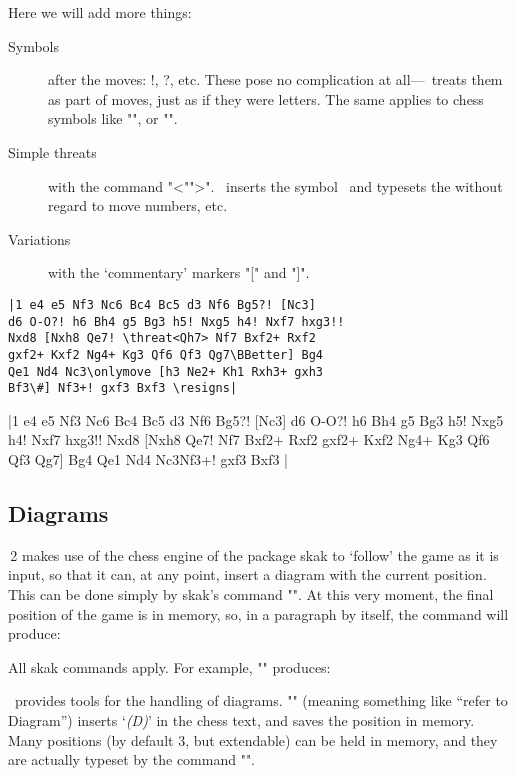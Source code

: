 \documentclass[12pt]{ltxdoc}
\begin{document}
Here we will add  more things:

\begin{description}
\item[Symbols] after the moves: !, ?, etc. These pose no complication at all---\TeXmate\ treats them as part of moves, just as if they were letters. The same applies to chess symbols like "\betteris", or "\onlymove".
\item[Simple threats] with the command \DescribeMacro{\threat}"\threat<"">". \TeXmate\ inserts the symbol \withidea\ and typesets the  without regard to move numbers, etc. 
\item[Variations] with the `commentary' markers \DescribeMacro{[}"[" and "]".
\end{description}

\makebarother
\begin{verbatim}
|1 e4 e5 Nf3 Nc6 Bc4 Bc5 d3 Nf6 Bg5?! [Nc3] 
d6 O-O?! h6 Bh4 g5 Bg3 h5! Nxg5 h4! Nxf7 hxg3!! 
Nxd8 [Nxh8 Qe7! \threat<Qh7> Nf7 Bxf2+ Rxf2 
gxf2+ Kxf2 Ng4+ Kg3 Qf6 Qf3 Qg7\BBetter] Bg4 
Qe1 Nd4 Nc3\onlymove [h3 Ne2+ Kh1 Rxh3+ gxh3 
Bf3\#] Nf3+! gxf3 Bxf3 \resigns|
\end{verbatim}

\makebarchess
\makegametitle
|1 e4 e5 Nf3 Nc6 Bc4 Bc5 d3 Nf6 Bg5?! [Nc3] d6 O-O?! h6 Bh4 g5 Bg3 h5! Nxg5 h4! Nxf7 hxg3!! Nxd8 [Nxh8 Qe7!  Nf7 Bxf2+ Rxf2 gxf2+ Kxf2 Ng4+ Kg3 Qf6 Qf3 Qg7\BBetter] Bg4 Qe1 Nd4 Nc3 Nf3+! gxf3 Bxf3 \resigns|

\subsection{Diagrams}\label{diagrams}
\TeXmate\,2 makes use of the chess engine of the package \textsf{skak} to `follow' the game as it is input, so that it can, at any point, insert a diagram with the current position. This can be done simply by \textsf{skak}'s command \SpecialIndex{\showboard}"\showboard". At this very moment, the final position of the game is in memory, so, in a paragraph by itself, the command will produce:

\showboard

\noindent All \textsf{skak} commands apply. For example, "\showonlypanws\showboard" produces:

\showonlypawns\showboard\showall

\bigskip\noindent
\TeXmate\ provides tools for the handling of diagrams. \DescribeMacro{\toD}"\toD" (meaning something like ``refer to Diagram'') inserts `\textit{(D)}' in the chess text, and saves the position in memory. \DescribeMacro{\makediagrams}Many positions (by default 3, but extendable) can be held in memory, and they are actually typeset by the command "\makediagrams".
\end{document}
